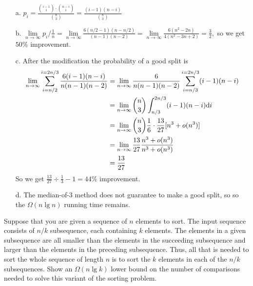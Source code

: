 \documentclass[12pt, a4paper, UTF8]{ctexart}
\begin{document}
\begin{solution}
  \begin{itemize}
    \item [a.] $p_{i} = \frac{\binom{i-1}{1}\cdot\binom{n-i}{1}}{\binom{n}{3}} 
      = \frac{(i-1)(n-i)}{\binom{n}{3}}$
    \item [b.] $\lim\limits_{n\rightarrow\infty} p_{i}/\frac{1}{n} 
      = \lim\limits_{n\rightarrow\infty} \frac{6(n/2-1)(n-n/2)}{(n-1)(n-2)} 
      = \lim\limits_{n\rightarrow\infty} \frac{6(n^{2} - 2n)}{4(n^{2} - 3n + 2)} 
      = \frac{3}{2},$ so we get $50\%$ improvement.
    \item [c.] After the modification the probability of a good split is
      \begin{align}
        \lim_{n\rightarrow\infty} \sum_{i=n/2}^{i=2n/3} \frac{6(i-1)(n-i)}{n(n-1)(n-2)}
            & = \lim_{n\rightarrow\infty} \frac{6}{n(n-1)(n-2)} \sum_{i=n/3}^{i=2n/3} (i-1)(n-i) \notag \\
            & = \lim_{n\rightarrow\infty} \binom{n}{3} \int_{n/3}^{2n/3} (i-1)(n-i)\text{d}i \notag \\
            & = \lim_{n\rightarrow\infty} \binom{n}{3} \frac{1}{6}\cdot\frac{13}{27}[n^{3} + o(n^{3})] \notag \\
            & = \lim_{n\rightarrow\infty} \frac{13}{27} \frac{n^{3} + o(n^{3})}{n^{3} + o(n^{3})} \notag \\
            & = \frac{13}{27} \notag
      \end{align}
      So we get $\frac{13}{27}\div\frac{1}{3} - 1 = 44\%$ improvement.
    \item [d.] The median-of-3 method does not guarantee to make a good split, so 
      so the $\Omega(n\lg n)$ running time remains.
  \end{itemize}
\end{solution}

\begin{problem}[TC: 8.1-4]
  Suppose that you are given a sequence of $n$ elements to sort. The input 
  sequence consists of $n/k$ subsequence, each containing $k$ elements. 
  The elements in a given subsequence are all smaller than the elements 
  in the succeeding subsequence and larger than the elements in the 
  preceding subsequence. Thus, all that is needed to sort the whole sequence 
  of length $n$ is to sort the $k$ elements in each of the $n/k$ subsequences. 
  Show an $\Omega(n\lg k)$ lower bound on the number of comparisons 
  needed to solve this variant of the sorting problem.
\end{problem}
\end{document}
